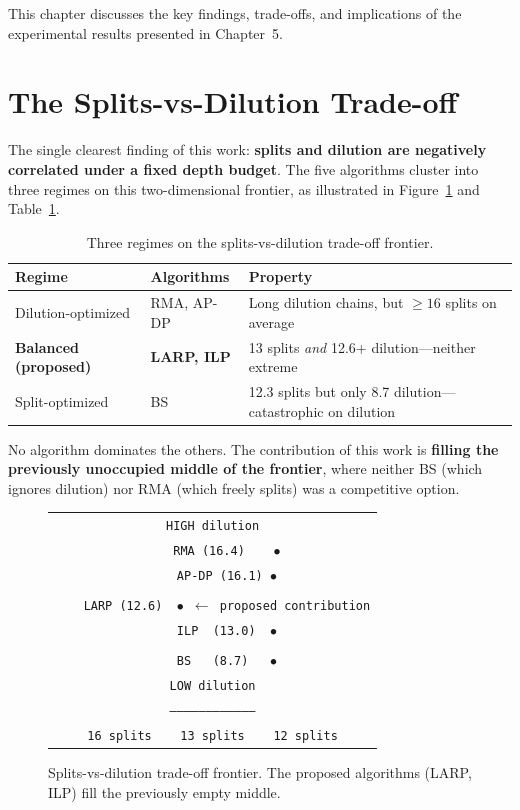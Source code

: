 
This chapter discusses the key findings, trade-offs, and implications of the experimental results presented in Chapter~5.

\section{The Splits-vs-Dilution Trade-off}

The single clearest finding of this work: \textbf{splits and dilution are negatively correlated under a fixed depth budget}. The five algorithms cluster into three regimes on this two-dimensional frontier, as illustrated in Figure~\ref{fig:tradeoff} and Table~\ref{tab:regimes}.

\begin{table}[H]
\centering
\caption{Three regimes on the splits-vs-dilution trade-off frontier.}
\label{tab:regimes}
\begin{tabular}{|l|l|p{7cm}|}
\hline
\textbf{Regime} & \textbf{Algorithms} & \textbf{Property} \\
\hline
Dilution-optimized & RMA, AP-DP & Long dilution chains, but $\geq 16$ splits on average \\
\hline
\textbf{Balanced (proposed)} & \textbf{LARP, ILP} & 13 splits \textit{and} 12.6+ dilution---neither extreme \\
\hline
Split-optimized & BS & 12.3 splits but only 8.7 dilution---catastrophic on dilution \\
\hline
\end{tabular}
\end{table}

No algorithm dominates the others. The contribution of this work is \textbf{filling the previously unoccupied middle of the frontier}, where neither BS (which ignores dilution) nor RMA (which freely splits) was a competitive option.

\begin{figure}[H]
\centering
\begin{tabular}{c}
\texttt{HIGH dilution} \\
\texttt{\ \ \ \ RMA (16.4)\ \ \ \ $\bullet$} \\
\texttt{\ \ \ \ AP-DP (16.1)\ $\bullet$} \\
\texttt{} \\
\texttt{\ \ \ \ LARP (12.6)\ \ $\bullet$ $\leftarrow$ proposed contribution} \\
\texttt{\ \ \ \ ILP\ \ (13.0)\ \ $\bullet$} \\
\texttt{} \\
\texttt{\ \ \ \ BS\ \ \ (8.7)\ \ \ $\bullet$} \\
\texttt{LOW dilution} \\
\texttt{-----------------------------------} \\
\texttt{16 splits\ \ \ \ 13 splits\ \ \ \ 12 splits}
\end{tabular}
\caption{Splits-vs-dilution trade-off frontier. The proposed algorithms (LARP, ILP) fill the previously empty middle.}
\label{fig:tradeoff}
\end{figure}

